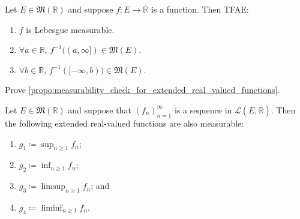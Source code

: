 \documentclass[notoc,notitlepage]{tufte-book}
\begin{document}
\begin{propo}\label{propo:measurability_check_for_extended_real_valued_functions}
  Let $E \in \mathfrak{M}(\mathbb{R})$ and suppose $f : E \to
  \overline{\mathbb{R}}$ is a function. Then TFAE:
  \begin{enumerate}
    \item $f$ is Lebesgue measurable.
    \item $\forall a \in \mathbb{R}$, $f^{-1}((a, \infty]) \in \mathfrak{M}(E)$.
    \item $\forall b \in \mathbb{R}$, $f^{-1}([-\infty, b)) \in
      \mathfrak{M}(E)$.
  \end{enumerate}
\end{propo}

\begin{ex}
  Prove \cref{propo:measurability_check_for_extended_real_valued_functions}.
\end{ex}

\begin{propo}\label{propo:measurability_of_limits_and_extremas}
  Let $E \in \mathfrak{M}(\mathbb{R})$ and suppose that $(f_n)_{n=1}^{\infty}$ 
  is a sequence in $\mathcal{L}(E, \overline{\mathbb{R}})$. Then the following
  extended real-valued functions are also measurable:
  \begin{enumerate}
    \item $g_1 \coloneqq \sup_{n \geq 1} f_n$;
    \item $g_2 \coloneqq \inf_{n \geq 1} f_n$;
    \item $g_3 \coloneqq \limsup_{n \geq 1} f_n$; and
    \item $g_4 \coloneqq \liminf_{n \geq 1} f_n$.
  \end{enumerate}
\end{propo}
\end{document}
